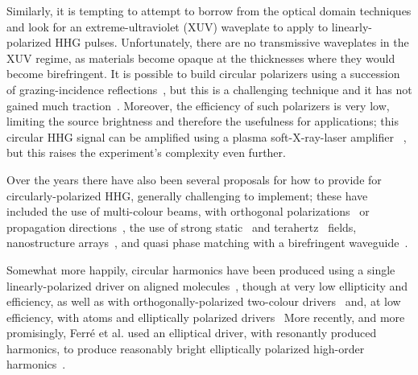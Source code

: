 Similarly, it is tempting to attempt to borrow from the optical domain techniques and look for an extreme-ultraviolet (XUV) waveplate to apply to linearly-polarized HHG pulses. Unfortunately, there are no transmissive waveplates in the XUV regime, as materials become opaque at the thicknesses where they would become birefringent. It is possible to build circular polarizers using a succession of grazing-incidence reflections~\cite{vodungbo_hhg-waveplate_2011}, but this is a challenging technique and it has not gained much traction~\cite{willems_hhg-waveplate_2015}. Moreover, the efficiency of such polarizers is very low, limiting the source brightness and therefore the usefulness for applications; this circular HHG signal can be amplified using a plasma soft-X-ray-laser amplifier~ \cite{depresseux_hhg-then-plasma-laser_2015}, but this raises the experiment's complexity even further.



Over the years there have also been several proposals for how to provide for circularly-polarized HHG, generally challenging to implement; these have included 
%
the use of multi-colour beams, with orthogonal polarizations~\cite{ruiz_elliptical-pulses-two-color_2009} 
%
or propagation directions~\cite{tong-chu_crossed-beam_1998, fleischer_linear-plus-elliptical-driver_2013}, 
%
the use of strong static~\cite{borca_static-field-circular-harmonics_2000}
%
and terahertz~\cite{yuan_elliptical-terahertz_2013} fields,
%
nanostructure arrays~\cite{husakou_circular-harmonics-nanostructures_2011}, 
%
and quasi phase matching with a birefringent waveguide~\cite{liu_circular-hhg-quasi-phase-matching_2012}. 



Somewhat more happily, circular harmonics have been produced using a single linearly-polarized driver on aligned molecules~\cite{zhou_aligned-molecules-elliptical-hhg_2009, mairesse_high-harmonic-spectroscopy_2010}, though at very low ellipticity and efficiency, 
%
as well as with or\-tho\-go\-na\-lly-polarized two-colour drivers~\cite{lambert_circular-hhg-cross-polarized_2015, stremoukhov_elliptical-harmonics_2016}
%
and, at low efficiency, with atoms and elliptically polarized drivers~\cite{ weihe_harmonics-polarization_1995, antoine_harmonics-polarization_1997, strelkov_harmonics-polarization-origin_2011}
%
More recently, and more promisingly, Ferré et al. used an elliptical driver, with resonantly produced harmonics, to produce reasonably bright elliptically polarized high-order harmonics~\cite{ferre_circular-harmonics_2015}.

